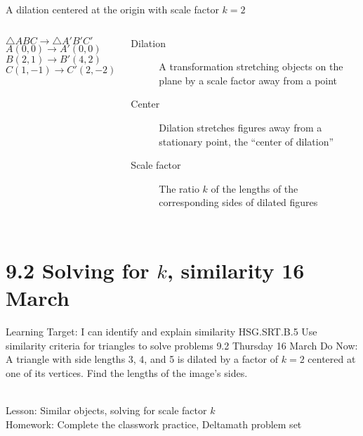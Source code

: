 \begin{frame}{A dilation centered at the origin with scale factor $k=2$}
  \begin{columns}
    $\triangle ABC \rightarrow \triangle A'B'C'$\\[0.2cm]
    $A(0,0) \rightarrow A'(0,0)$\\
    $B(2,1) \rightarrow B'(4,2)$\\
    $C(1,-1) \rightarrow C'(2,-2)$ \vspace{0.3cm}
      \begin{description}
        \item[Dilation] A transformation stretching objects on the plane by a scale factor away from a point
        \item[Center] Dilation stretches figures away from a stationary point, the ``center of dilation''
        \item[Scale factor] The ratio $k$ of the lengths of the corresponding sides of dilated figures
      \end{description}
    \begin{flushright}
    \end{flushright}
  \end{columns}
\end{frame}

\section{9.2 Solving for $k$, similarity \hfill 16 March \,}
\begin{frame}{Learning Target: I can identify and explain similarity}
  {HSG.SRT.B.5 Use similarity criteria for triangles to solve problems \hfill \alert{9.2 Thursday 16 March}}
    Do Now: A triangle with side lengths 3, 4, and 5 is dilated by a factor of $k=2$ centered at one of its vertices. Find the lengths of the image's sides. \\[0.5cm]
     \\[0.5cm]
    Lesson: Similar objects, solving for scale factor $k$ \\[0.5cm]
    Homework: Complete the classwork practice, Deltamath problem set \\[0.5cm]
\end{frame}

